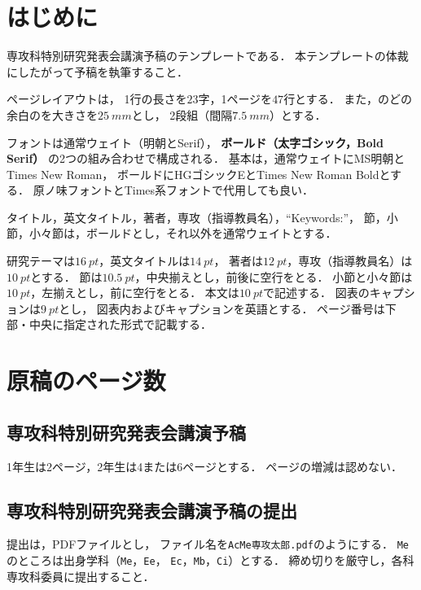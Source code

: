 \documentclass[
	fonts=word
	\ifdefined\kanjiskip , dvipdfmx \fi
]{ac-resume}
\begin{document}
\maketitle

\section{はじめに}

専攻科特別研究発表会講演予稿のテンプレートである．
本テンプレートの体裁にしたがって予稿を執筆すること．

ページレイアウトは，
1行の長さを$23$字，1ページを$47$行とする．
また，のどの余白のを大きさを$\SI{25}{mm}$とし，
2段組（間隔$\SI{7.5}{mm}$）とする．

フォントは通常ウェイト（明朝とSerif），
\textbf{ボールド（太字ゴシック，Bold Serif）}
の2つの組み合わせで構成される．
基本は，通常ウェイトにMS明朝とTimes New Roman，
ボールドにHGゴシックEとTimes New Roman Boldとする．
原ノ味フォントとTimes系フォントで代用しても良い．

タイトル，英文タイトル，著者，専攻（指導教員名），``Keywords:''，
節，小節，小々節は，ボールドとし，それ以外を通常ウェイトとする．

研究テーマは$\SI{16}{pt}$，英文タイトルは$\SI{14}{pt}$，
著者は$\SI{12}{pt}$，専攻（指導教員名）は$\SI{10}{pt}$とする．
節は$\SI{10.5}{pt}$，中央揃えとし，前後に空行をとる．
小節と小々節は$\SI{10}{pt}$，左揃えとし，前に空行をとる．
本文は$\SI{10}{pt}$で記述する．
図表のキャプションは$\SI{9}{pt}$とし，
図表内およびキャプションを英語とする．
ページ番号は下部・中央に指定された形式で記載する．

\section{原稿のページ数}

\subsection{専攻科特別研究発表会講演予稿}

1年生は2ページ，2年生は4または6ページとする．
ページの増減は認めない．

\subsection{専攻科特別研究発表会講演予稿の提出}

提出は，PDFファイルとし，
ファイル名を\texttt{AcMe\mbox{}専攻太郎.pdf}のようにする．
\texttt{Me}のところは出身学科（\texttt{Me}，\texttt{Ee}，
\texttt{Ec}，\texttt{Mb}，\texttt{Ci}）とする．
締め切りを厳守し，各科専攻科委員に提出すること．
\end{document}
